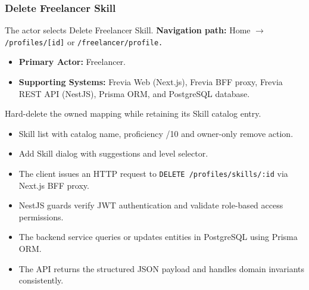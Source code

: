 \subsubsection{Delete Freelancer Skill}

The actor selects Delete Freelancer Skill.\newline
\textbf{Navigation path:} Home $\rightarrow$ \texttt{/\allowbreak{}profiles/\allowbreak{}[id]} or \texttt{/\allowbreak{}freelancer/\allowbreak{}profile.}


\begin{itemize}[leftmargin=1.6em,topsep=3pt,itemsep=2pt,parsep=0pt,label=$\bullet$]
    \item \textbf{Primary Actor:} Freelancer.
    \item \textbf{Supporting Systems:} Frevia Web (Next.js), Frevia BFF proxy, Frevia REST API (NestJS), Prisma ORM, and PostgreSQL database.
\end{itemize}

\noindent Hard-delete the owned mapping while retaining its Skill catalog entry.

\begin{itemize}[leftmargin=1.6em,topsep=3pt,itemsep=2pt,parsep=0pt,label=$\bullet$]
    \item Skill list with catalog name, proficiency /10 and owner-only remove action.
    \item Add Skill dialog with suggestions and level selector.
\end{itemize}

\begin{itemize}[leftmargin=1.6em,topsep=3pt,itemsep=2pt,parsep=0pt,label=$\bullet$]
    \item The client issues an HTTP request to \texttt{DELETE /\allowbreak{}profiles/\allowbreak{}skills/\allowbreak{}:\allowbreak{}id} via Next.js BFF proxy.
    \item NestJS guards verify JWT authentication and validate role-based access permissions.
    \item The backend service queries or updates entities in PostgreSQL using Prisma ORM.
    \item The API returns the structured JSON payload and handles domain invariants consistently.
\end{itemize}

